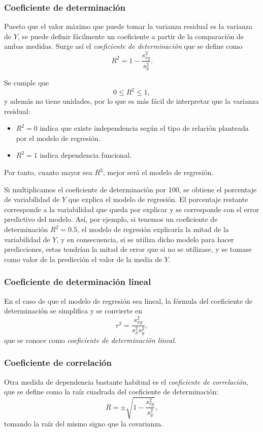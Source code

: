 \subsubsection{Coeficiente de determinación}
Puesto que el valor máximo que puede tomar la varianza residual es la varianza
de $Y$, se puede definir fácilmente un coeficiente a partir de la comparación
de ambas medidas. Surge así el \emph{coeficiente de determinación} que se
define como
\[
R^2=1-\frac{s^2_{ry}}{s_y^2}.
\]

Se cumple que
\[ 0\leq R^2\leq 1,\]
y además no tiene unidades, por lo que es más fácil de interpretar que la
varianza residual:
\begin{itemize}
\item $R^2=0$ indica que existe independencia según el
tipo de relación planteada por el modelo de regresión.
\item $R^2=1$ indica dependencia funcional.
\end{itemize}
Por tanto, cuanto mayor sea $R^2$, mejor será el modelo de regresión.

Si multiplicamos el coeficiente de determinación por 100, se obtiene el
porcentaje de variabilidad de $Y$ que explica el modelo de regresión. El
porcentaje restante corresponde a la variabilidad que queda por explicar y se
corresponde con el error predictivo del modelo. Así, por ejemplo, si tenemos
un coeficiente de determinación $R^2=0.5$, el modelo de regresión explicaría
la mitad de la variabilidad de $Y$, y en consecuencia, si se utiliza dicho
modelo para hacer predicciones, estas tendrían la mitad de error que si no se
utilizase, y se tomase como valor de la predicción el valor de la media de $Y$.

\subsubsection{Coeficiente de determinación lineal}
En el caso de que el modelo de regresión sea lineal, la fórmula del
coeficiente de determinación se simplifica y se convierte en
\[
r^2=\frac{s_{xy}^2}{s_x^2 s_y^2},
\]
que se conoce como \emph{coeficiente de determinación lineal}.

\subsubsection{Coeficiente de correlación}
Otra medida de dependencia bastante habitual es el \emph{coeficiente de
correlación}, que se define como la raíz cuadrada del coeficiente de
determinación:
\[
R=\pm\sqrt{1-\frac{s^2_{ry}}{s_y^2}},
\]
tomando la raíz del mismo signo que la covarianza.

